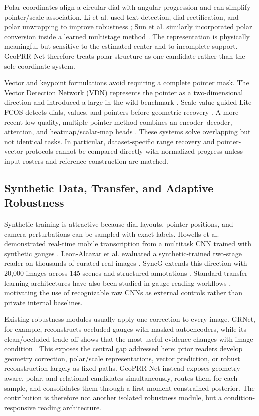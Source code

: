 \documentclass[electronics,article,submit,oneauthor]{Definitions/mdpi}
\newcommand{\modelname}{GeoPRR-Net\xspace}
\begin{document}
Polar coordinates align a circular dial with angular progression and can simplify pointer/scale association. Li et al. used text detection, dial rectification, and polar unwrapping to improve robustness \cite{li2020text}; Sun et al. similarly incorporated polar conversion inside a learned multistage method \cite{sun2023pointer}. The representation is physically meaningful but sensitive to the estimated center and to incomplete support. \modelname therefore treats polar structure as one candidate rather than the sole coordinate system.

Vector and keypoint formulations avoid requiring a complete pointer mask. The Vector Detection Network (VDN) represents the pointer as a two-dimensional direction and introduced a large in-the-wild benchmark \cite{dong2021vdn}. Scale-value-guided Lite-FCOS detects dials, values, and pointers before geometric recovery \cite{wang2023litefcos}. A more recent low-quality, multiple-pointer method combines an encoder--decoder, attention, and heatmap/scalar-map heads \cite{feng2025wild}. These systems solve overlapping but not identical tasks. In particular, dataset-specific range recovery and pointer-vector protocols cannot be compared directly with normalized progress unless input rosters and reference construction are matched.

\subsection{Synthetic Data, Transfer, and Adaptive Robustness}

Synthetic training is attractive because dial layouts, pointer positions, and camera perturbations can be sampled with exact labels. Howells et al. demonstrated real-time mobile transcription from a multitask CNN trained with synthetic gauges \cite{howells2021analogue}. Leon-Alcazar et al. evaluated a synthetic-trained two-stage reader on thousands of curated real images \cite{leonalcazar2024synthetic}. SyncG extends this direction with 20,000 images across 145 scenes and structured annotations \cite{deng2026syncg}. Standard transfer-learning architectures have also been studied in gauge-reading workflows \cite{ninama2024transfer}, motivating the use of recognizable raw CNNs as external controls rather than private internal baselines.

Existing robustness modules usually apply one correction to every image. GRNet, for example, reconstructs occluded gauges with masked autoencoders, while its clean/occluded trade-off shows that the most useful evidence changes with image condition \cite{ninama2026grnet}. This exposes the central gap addressed here: prior readers develop geometry correction, polar/scale representations, vector prediction, or robust reconstruction largely as fixed paths. \modelname instead exposes geometry-aware, polar, and relational candidates simultaneously, routes them for each sample, and consolidates them through a first-moment-constrained posterior. The contribution is therefore not another isolated robustness module, but a condition-responsive reading architecture.
\end{document}
